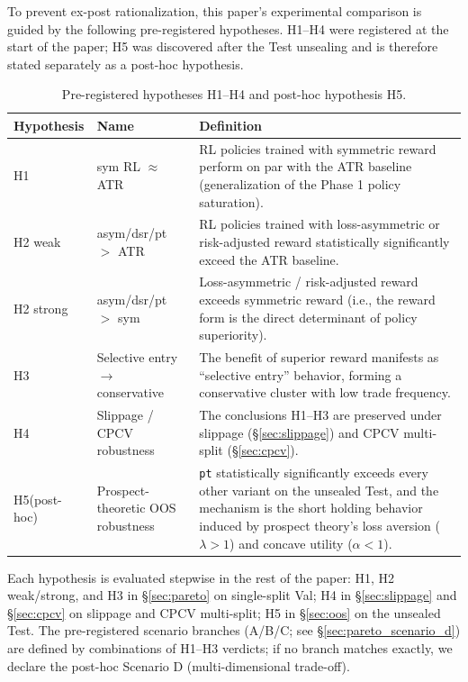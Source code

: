 \documentclass[11pt, a4paper]{article}
\begin{document}
To prevent ex-post rationalization, this paper's experimental comparison is
guided by the following pre-registered hypotheses. H1--H4 were registered at
the start of the paper; H5 was discovered after the Test unsealing and is
therefore stated separately as a post-hoc hypothesis.

\begin{table}[!htbp]
\centering
\small
\caption{Pre-registered hypotheses H1--H4 and post-hoc hypothesis H5.}
\begin{tabular}{p{1.8cm}p{5cm}p{6.5cm}}
\toprule
Hypothesis & Name & Definition \\
\midrule
H1 & sym RL $\approx$ ATR & RL policies trained with symmetric reward perform on par with the ATR baseline (generalization of the Phase 1 policy saturation). \\
H2 weak & asym/dsr/pt $>$ ATR & RL policies trained with loss-asymmetric or risk-adjusted reward statistically significantly exceed the ATR baseline. \\
H2 strong & asym/dsr/pt $>$ sym & Loss-asymmetric / risk-adjusted reward exceeds symmetric reward (i.e., the reward form is the direct determinant of policy superiority). \\
H3 & Selective entry $\to$ conservative & The benefit of superior reward manifests as ``selective entry'' behavior, forming a conservative cluster with low trade frequency. \\
H4 & Slippage / CPCV robustness & The conclusions H1--H3 are preserved under slippage (\S\ref{sec:slippage}) and CPCV multi-split (\S\ref{sec:cpcv}). \\
\midrule
H5\newline(post-hoc) & Prospect-theoretic OOS robustness & \texttt{pt} statistically significantly exceeds every other variant on the unsealed Test, and the mechanism is the short holding behavior induced by prospect theory's loss aversion ($\lambda > 1$) and concave utility ($\alpha < 1$). \\
\bottomrule
\end{tabular}
\label{tab:hypotheses}
\end{table}

Each hypothesis is evaluated stepwise in the rest of the paper:
H1, H2 weak/strong, and H3 in \S\ref{sec:pareto} on single-split Val;
H4 in \S\ref{sec:slippage} and \S\ref{sec:cpcv} on slippage and CPCV
multi-split; H5 in \S\ref{sec:oos} on the unsealed Test. The
pre-registered scenario branches (A/B/C; see \S\ref{sec:pareto_scenario_d})
are defined by combinations of H1--H3 verdicts; if no branch matches exactly,
we declare the post-hoc Scenario D (multi-dimensional trade-off).
\end{document}
